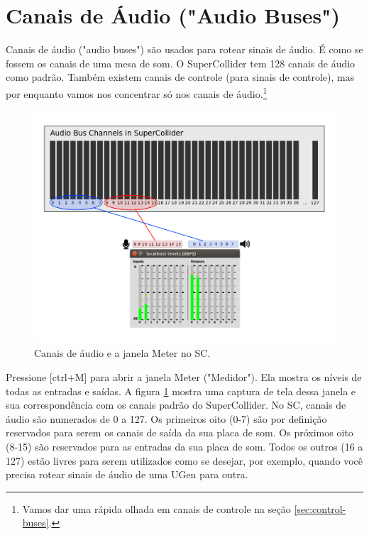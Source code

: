 \section{Canais de Áudio ("Audio Buses")}
\label{sec:audiobus}

Canais de áudio ("audio buses") são usados para rotear sinais de áudio. É como se fossem os canais de uma mesa de som. O SuperCollider tem 128 canais de áudio como padrão. Também existem canais de controle (para sinais de controle), mas por enquanto vamos nos concentrar só nos canais de áudio.\footnote{Vamos dar uma rápida olhada em canais de controle na seção \ref{sec:control-buses}.}

\begin{figure}[h!]
\centerline{
	\includegraphics[scale=0.4]{fig-audio-bus.png}}
\caption{Canais de áudio e a janela Meter no SC.}
\label{fig:audio-bus}
\end{figure}

Pressione [ctrl+M] para abrir a janela Meter ("Medidor"). Ela mostra os níveis de todas as entradas e saídas. A figura \ref{fig:audio-bus} mostra uma captura de tela dessa janela e sua correspondência com os canais padrão do SuperCollider. No SC, canais de áudio são numerados de 0 a 127. Os primeiros oito (0-7) são por definição reservados para serem os canais de saída da sua placa de som. Os próximos oito (8-15) são reservados para as entradas da sua placa de som. Todos os outros (16 a 127) estão livres para serem utilizados como se desejar, por exemplo, quando você precisa rotear sinais de áudio de uma UGen para outra.

